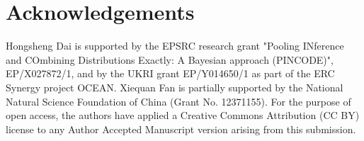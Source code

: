 \documentclass[12pt]{amsart}
\theoremstyle{definition}
\theoremstyle{remark}
\numberwithin{equation}{section}
\begin{document}
\section*{Acknowledgements}
Hongsheng Dai is supported by the EPSRC research grant "Pooling INference and COmbining Distributions Exactly: A Bayesian approach (PINCODE)", EP/X027872/1, and by the UKRI grant EP/Y014650/1 as part of the ERC Synergy project OCEAN. Xiequan Fan is partially supported by the National Natural Science Foundation of China (Grant No. 12371155). For the purpose of open access, the authors have applied a Creative Commons Attribution (CC BY) license to any Author Accepted Manuscript version arising from this submission.




\end{document}
